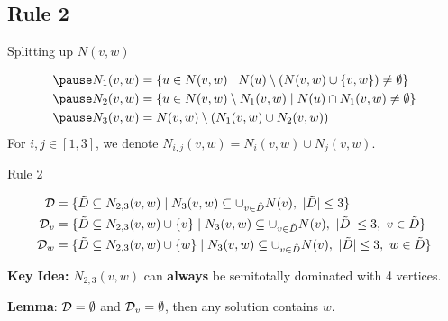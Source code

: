 \subsection{Rule 2}
\begin{frame}[c]{Splitting up $N(v,w)$}

    \begin{figure}[!ht]
    \end{figure}

    \begin{align}
      \pause  N_1(v,w) & = \{u \in N(v,w) \mid N(u) \setminus (N(v,w)\cup \{v,w\}) \neq \emptyset \}  \\
      \pause  N_2(v,w) & = \{u \in N(v,w)\setminus N_1(v,w) \mid N(u) \cap N_1(v,w) \neq \emptyset \} \\
      \pause  N_3(v,w) & =  N(v,w) \setminus (N_1(v,w) \cup N_2(v,w))
    \end{align}
    For $i,j \in [1,3]$, we denote $N_{i,j}(v,w) = N_i(v,w) \cup N_j(v,w)$.
\end{frame}


\begin{frame}[c]{Rule 2}
    \begin{figure}[!ht]
    \end{figure}
    \pause\begin{align}
        \mathcal{D} & = \{ \tilde D \subseteq N_{2,3}(v,w)            \mid N_3(v,w) \subseteq \cup_{v \in \tilde D} N(v),\ |\tilde D| \leq 3                  \} \\
        \mathcal{D}_{v}  & = \{ \tilde D \subseteq N_{2,3}(v,w) \cup \{v\} \mid N_3(v,w) \subseteq \cup_{v \in \tilde D} N(v),\ |\tilde D| \leq 3,\ v \in \tilde D \} \\
        \mathcal{D}_{w}  & = \{ \tilde D \subseteq N_{2,3}(v,w) \cup \{w\} \mid N_3(v,w) \subseteq \cup_{v \in \tilde D} N(v),\ |\tilde D| \leq 3,\ w \in \tilde D \}
    \end{align}
    
    \pause \textbf{Key Idea: } $N_{2,3}(v, w)$ can \textbf{always} be semitotally dominated with 4 vertices.

    \pause \textbf{Lemma}: $\mathcal{D} = \emptyset$ and $\mathcal{D}_{v} = \emptyset$, then any solution contains $w$.
\end{frame}


